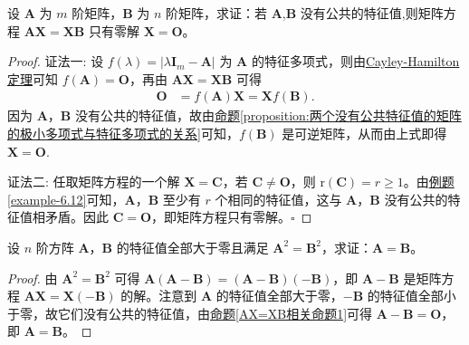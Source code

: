 \documentclass[../../main.tex]{subfiles}
\begin{document}
\begin{proposition}\label{AX=XB相关命题1}
设 \(\boldsymbol{A}\) 为 \(m\) 阶矩阵，\(\boldsymbol{B}\) 为 \(n\) 阶矩阵，求证：若 \(\boldsymbol{A}\),\(\boldsymbol{B}\) 没有公共的特征值,则矩阵方程 \(\boldsymbol{AX = XB}\) 只有零解 \(\boldsymbol{X = O}\)。 
\end{proposition}
\begin{proof}
{\color{blue}证法一:}
设 \(f(\lambda)=|\lambda\boldsymbol{I}_m - \boldsymbol{A}|\) 为 \(\boldsymbol{A}\) 的特征多项式，则由\hyperref[theorem:Cayley-Hamilton定理]{Cayley-Hamilton定理}可知 \(f(\boldsymbol{A})=\boldsymbol{O}\)，再由 \(\boldsymbol{AX = XB}\) 可得
\begin{align*}
\boldsymbol{O}&=f(\boldsymbol{A})\boldsymbol{X}=\boldsymbol{X}f(\boldsymbol{B}).
\end{align*}
因为 \(\boldsymbol{A}\)，\(\boldsymbol{B}\) 没有公共的特征值，故由\hyperref[proposition:两个没有公共特征值的矩阵的极小多项式与特征多项式的关系]{命题\ref{proposition:两个没有公共特征值的矩阵的极小多项式与特征多项式的关系}}可知，\(f(\boldsymbol{B})\) 是可逆矩阵，从而由上式即得 \(\boldsymbol{X = O}\).

{\color{blue}证法二:}
任取矩阵方程的一个解 \(\boldsymbol{X = C}\)，若 \(\boldsymbol{C\neq O}\)，则 \(\mathrm{r}(\boldsymbol{C}) = r\geq 1\)。由\hyperref[example-6.12]{例题\ref{example-6.12}}可知，\(\boldsymbol{A}\)，\(\boldsymbol{B}\) 至少有 \(r\) 个相同的特征值，这与 \(\boldsymbol{A}\)，\(\boldsymbol{B}\) 没有公共的特征值相矛盾。因此 \(\boldsymbol{C = O}\)，即矩阵方程只有零解。\(\square\) 
\end{proof}

\begin{example}
设 \(n\) 阶方阵 \(\boldsymbol{A}\)，\(\boldsymbol{B}\) 的特征值全部大于零且满足 \(\boldsymbol{A}^2 = \boldsymbol{B}^2\)，求证：\(\boldsymbol{A} = \boldsymbol{B}\)。
\end{example}
\begin{proof}
由 \(\boldsymbol{A}^2 = \boldsymbol{B}^2\) 可得 \(\boldsymbol{A}(\boldsymbol{A - B}) = (\boldsymbol{A - B})(-\boldsymbol{B})\)，即 \(\boldsymbol{A - B}\) 是矩阵方程 \(\boldsymbol{AX = X(-B)}\) 的解。注意到 \(\boldsymbol{A}\) 的特征值全部大于零，\(-\boldsymbol{B}\) 的特征值全部小于零，故它们没有公共的特征值，由\hyperref[AX=XB相关命题1]{命题\ref{AX=XB相关命题1}}可得 \(\boldsymbol{A - B} = \boldsymbol{O}\)，即 \(\boldsymbol{A} = \boldsymbol{B}\)。
\end{proof}
\end{document}

